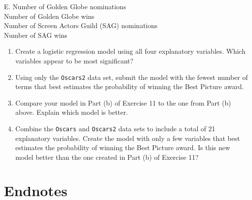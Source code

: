 \documentclass[
]{report}
\newcounter{excount}
\renewcommand{\theexcount}{E\arabic{excount}}
\begin{document}
\begin{list}{\theexcount.}{ \setlength{\itemsep}{1.2em}}
Number of Golden Globe nominations \\
Number of Golden Globe wins \\
Number of Screen Actors Guild (SAG) nominations \\
Number of SAG wins

  \begin{enumerate}
    \item Create a logistic regression model using all four explanatory variables. Which variables appear to be most significant?
    \item Using only the \texttt{Oscars2} data set, submit the model with the fewest number of terms that best estimates the probability of winning the Best Picture award.
    \item Compare your model in Part (b) of Exercise 11 to the one from Part (b) above. Explain which model is better.
    \item Combine the \texttt{Oscars} and \texttt{Oscars2} data sets to include a total of 21 explanatory variables. Create the model with only a few variables that best estimates the probability of winning the Best Picture award. Is this new model better than the one created in Part (b) of Exercise 11?
  \end{enumerate}

\end{list}

\hypertarget{endnotes-4}{%
\section*{\texorpdfstring{\textbf{Endnotes}}{Endnotes}}\label{endnotes-4}}
\end{document}
